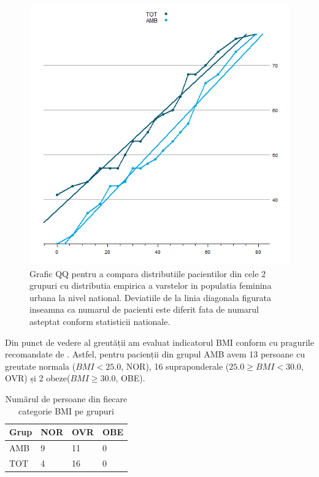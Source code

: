 \documentclass[12pt,draft]{article}
\begin{document}
  \begin{figure}[H]
   \centering
   \includegraphics[width=0.8\linewidth]{totVarstaQQ}
   \caption{Grafic QQ pentru a compara distributiile pacientilor din cele 2 grupuri cu distributia empirica a varstelor in populatia feminina urbana la nivel national. Deviatiile de la linia diagonala figurata inseamna ca numarul de pacienti este diferit fata de numarul asteptat conform statisticii nationale. }
   \label{fig:totVarstaQQ}
  \end{figure}
  Din punct de vedere al greutății am evaluat indicatorul \ac{BMI} conform cu pragurile recomandate de \citep{whobmi06}. 
  Astfel, pentru pacienții din grupul AMB avem 13 persoane cu greutate normala ($BMI<25.0$, NOR), 16 supraponderale ($25.0 \geq BMI <30.0$, OVR) și 2 obeze($BMI \geq 30.0$, OBE).
  \begin{table}[H]
   \centering
   \begin{tabular}{ |l|l|l|l| }
    \hline
    Grup & NOR & OVR & OBE \\ \hline
    AMB & 9 & 11 & 0 \\ \hline
    TOT & 4 &  16 & 0 \\ \hline
   \end{tabular}
   \caption{Numărul de persoane din fiecare categorie \ac{BMI} pe grupuri}
   \label{tab:BMIgSex}
  \end{table}
\end{document}

